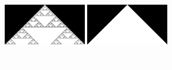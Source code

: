 \documentclass{article}
\newcommand{\todo}[1]{\colorbox{WildStrawberry}{\textcolor{white}{#1}}}
\begin{document}
\begin{figure}[h]
    \includegraphics[width=0.32\textwidth]{ca-rules/single1/rule-182.png}\hspace{0.01\textwidth}%
    \includegraphics[width=0.32\textwidth]{ca-rules/single1/rule-222-254.png}%
    \hspace{0.01\textwidth}%
    \caption{\todo{fill caption}}
    \label{fig:supplement:ca-rules-single}
\end{figure}
\end{document}
